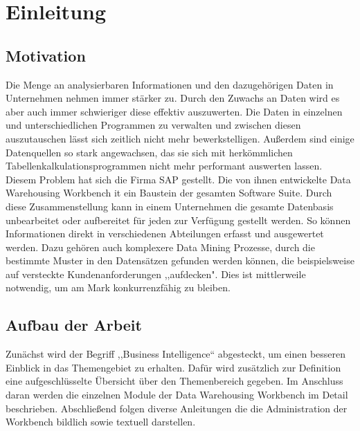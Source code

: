 \chapter{Einleitung}
\label{Kapitel:Einleitung}


\section{Motivation}
 
 Die Menge an analysierbaren  Informationen und den dazugehörigen Daten in Unternehmen nehmen immer stärker zu.  Durch den Zuwachs an Daten wird es aber auch immer schwieriger diese effektiv auszuwerten. Die  Daten in einzelnen und unterschiedlichen Programmen zu verwalten und zwischen diesen auszutauschen lässt sich zeitlich nicht mehr bewerkstelligen. Außerdem sind einige Datenquellen so stark angewachsen, das sie sich mit herkömmlichen Tabellenkalkulationsprogrammen nicht mehr performant auswerten lassen. \\
Diesem Problem hat sich die Firma SAP gestellt. Die von ihnen entwickelte Data Warehousing Workbench it ein Baustein der gesamten Software Suite.  Durch diese Zusammenstellung kann in einem  Unternehmen die gesamte Datenbasis unbearbeitet oder aufbereitet für jeden zur Verfügung gestellt werden. So können Informationen direkt in verschiedenen Abteilungen erfasst und ausgewertet werden. Dazu gehören auch komplexere Data Mining Prozesse, durch die bestimmte Muster in den Datensätzen gefunden werden können, die beispielsweise auf versteckte Kundenanforderungen ,,aufdecken".  Dies ist mittlerweile notwendig, um am Mark konkurrenzfähig zu bleiben. \cite[S. 46 f.]{Herschel:2013kz}
 
\section{ Aufbau der Arbeit}

Zunächst wird der Begriff ,,Business Intelligence`` abgesteckt, um einen besseren Einblick in das Themengebiet zu erhalten. Dafür wird zusätzlich zur Definition  eine aufgeschlüsselte Übersicht über den Themenbereich gegeben. Im Anschluss daran werden die einzelnen Module der Data Warehousing Workbench im Detail beschrieben. Abschließend folgen diverse Anleitungen die die Administration der Workbench bildlich sowie textuell darstellen.
 
